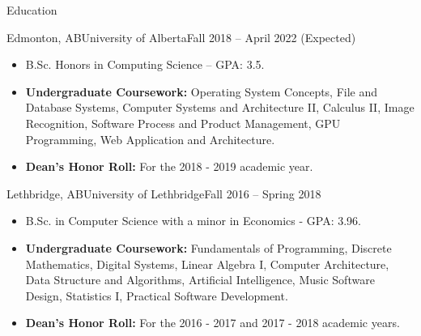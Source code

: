 \documentclass[]{mcdowellcv}
\begin{document}
\makeheader

\begin{cvsection}{Education}
  \begin{cvsubsection}{Edmonton, AB}{University of Alberta}{Fall 2018 -- April 2022 (Expected)}
    \begin{itemize}
      \item B.Sc. Honors in Computing Science -- GPA: 3.5.
      \item \textbf{Undergraduate Coursework:} Operating System Concepts, File and Database Systems,
        Computer Systems and Architecture II, Calculus II, Image Recognition, Software Process and Product Management, GPU Programming,
        Web Application and Architecture.
      \item \textbf{Dean's Honor Roll:} For the 2018 - 2019 academic year. 
    \end{itemize}
  \end{cvsubsection}

  \begin{cvsubsection}{Lethbridge, AB}{University of Lethbridge}{Fall 2016 -- Spring 2018}
    \begin{itemize}   
      \item B.Sc. in Computer Science with a minor in Economics - GPA: 3.96.
      \item \textbf{Undergraduate Coursework:} Fundamentals of Programming, Discrete Mathematics, 
        Digital Systems, Linear Algebra I, Computer Architecture, Data Structure and Algorithms, 
        Artificial Intelligence, Music Software Design, Statistics I, Practical Software Development.
      \item \textbf{Dean's Honor Roll:} For the 2016 - 2017 and 2017 - 2018 academic years.
    \end{itemize}
  \end{cvsubsection}
\end{cvsection}

\vspace*{-10pt}
\end{document}
